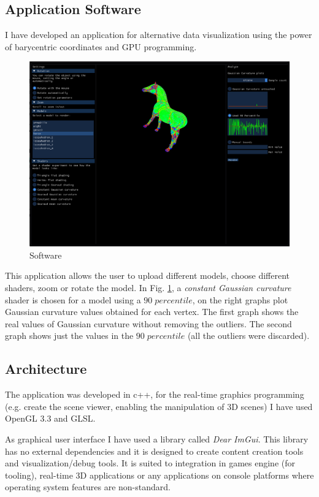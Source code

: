 \subsection{Application Software}
I have developed an application for alternative data visualization using the power of barycentric coordinates and GPU programming.
\begin{figure}[!h]
    \includegraphics[scale=0.4]{images/program.png}
    \caption{Software}
    \label{fig:software}
\end{figure}
This application allows the user to upload different models, choose different shaders, zoom or rotate the model.
In Fig. \ref{fig:software}, a \textit{constant Gaussian curvature} shader is chosen for a model using a $90 \; percentile$, on the right graphs plot Gaussian curvature values obtained for each vertex. The first graph shows the real values of Gaussian curvature without removing the outliers. The second graph shows just the values in the $90 \; percentile$ (all the outliers were discarded).

\subsection{Architecture}
The application was developed in c++, for the real-time graphics programming (e.g. create the scene viewer, enabling the manipulation of 3D scenes) I have used OpenGL $3.3$ and GLSL.

As graphical user interface I have used a library called \textit{Dear ImGui}. This library has no external dependencies and it is designed to create content creation tools and visualization/debug tools. It is suited to integration in games engine (for tooling), real-time 3D applications or any applications on console platforms where operating system features are non-standard.

